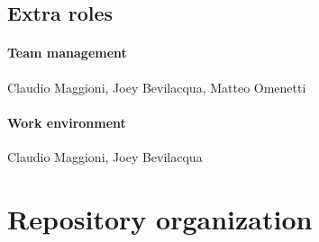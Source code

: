 \documentclass[hidelinks,12pt,a4paper,numbers=enddot]{scrartcl}
\begin{document}
\subsection{Extra roles}

\paragraph{Team management}
Claudio Maggioni, Joey Bevilacqua, Matteo Omenetti

\paragraph{Work environment}
Claudio Maggioni, Joey Bevilacqua

\section{Repository organization}\label{repository-organization}
\end{document}

